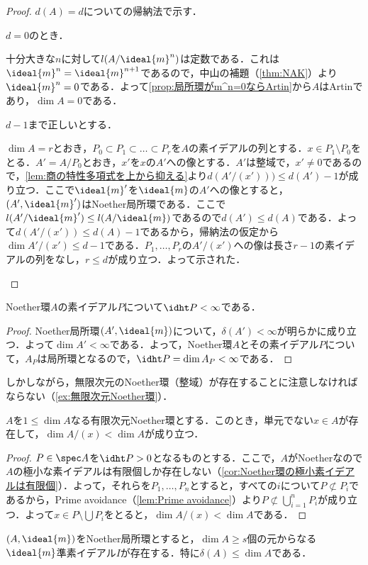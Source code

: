 \begin{proof}
	$d(A)=d$についての帰納法で示す．
	\begin{step}
		\item $d=0$のとき．
		
		十分大きな$n$に対して$l(A/\ideal{m}^n)$は定数である．これは$\ideal{m}^n=\ideal{m}^{n+1}$であるので，中山の補題（\ref{thm:NAK}）より$\ideal{m}^n=0$である．よって\ref{prop:局所環がm^n=0ならArtin}から$A$はArtinであり，$\dim A=0$である．
		
		\item $d-1$まで正しいとする．
		
		$\dim A=r$とおき，$P_0\subset P_1\subset\dots\subset P_r$を$A$の素イデアルの列とする．$x\in P_1\setminus P_0$をとる．$A'=A/P_0$とおき，$x'$を$x$の$A'$への像とする．$A'$は整域で，$x'\neq0$であるので，\ref{lem:商の特性多項式を上から抑える}より$d(A'/(x')))\leq d(A')-1$が成り立つ．ここで$\ideal{m}'$を$\ideal{m}$の$A'$への像とすると，$(A',\ideal{m}')$はNoether局所環である．ここで$l(A'/\ideal{m}')\leq l(A/\ideal{m})$であるので$d(A')\leq d(A)$である．よって$d(A'/(x'))\leq d(A)-1$であるから，帰納法の仮定から$\dim A'/(x')\leq d-1$である．$P_1,\dots,P_r$の$A'/(x')$への像は長さ$r-1$の素イデアルの列をなし，$r\leq d$が成り立つ．よって示された．
	\end{step}
\end{proof}

\begin{cor}
	Noether環$A$の素イデアル$P$について$\idht P<\infty$である．
\end{cor}

\begin{proof}
	Noether局所環$(A',\ideal{m})$について，$\delta(A')<\infty$が明らかに成り立つ．よって$\dim A'<\infty$である．よって，Noether環$A$とその素イデアル$P$について，$A_P$は局所環となるので，$\idht P=\dim A_P<\infty$である．
\end{proof}

しかしながら，無限次元のNoether環（整域）が存在することに注意しなければならない（\ref{ex:無限次元Noether環}）．

\begin{lem}
	$A$を$1\leq\dim A$なる有限次元Noether環とする．このとき，単元でない$x\in A$が存在して，$\dim A/(x)<\dim A$が成り立つ．
\end{lem}

\begin{proof}
	$P\in\spec A$を$\idht P>0$となるものとする．ここで，$A$がNoetherなので$A$の極小な素イデアルは有限個しか存在しない（\ref{cor:Noether環の極小素イデアルは有限個}）．よって，それらを$P_1,\dots, P_n$とすると，すべての$i$について$P\not\subset P_i$であるから，Prime avoidance（\ref{lem:Prime avoidance}）より$P\not\subset\bigcup_{i=1}^nP_i$が成り立つ．よって$x\in P\setminus\bigcup P_i$をとると，$\dim A/(x)<\dim A$である．

\end{proof}
\begin{prop}\label{prop:dim A geq delta(A)}
	$(A,\ideal{m})$をNoether局所環とすると，$\dim A\geq s$個の元からなる$\ideal{m}$準素イデアル$I$が存在する．特に$\delta(A)\leq\dim A$である．
\end{prop}

